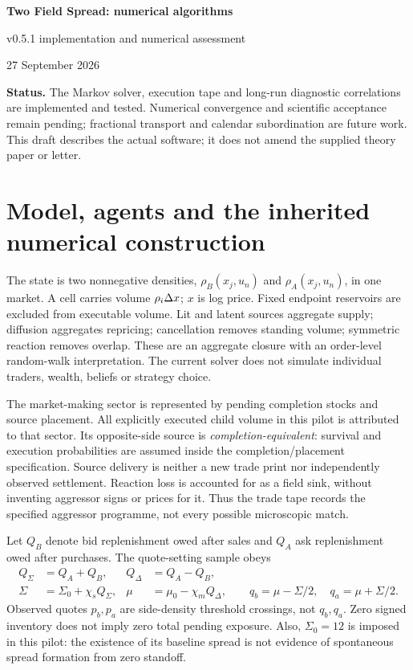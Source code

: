 \documentclass[11pt,a4paper]{article}
\begin{document}
\begin{center}
{\Large\bfseries Two Field Spread: numerical algorithms}\par
{\large v0.5.1 implementation and numerical assessment}\par
27 September 2026
\end{center}
\textbf{Status.} The Markov solver, execution tape and long-run diagnostic correlations are
implemented and tested. Numerical convergence and scientific acceptance
remain pending; fractional transport and calendar subordination are future work. This draft describes the actual
software; it does not amend the supplied theory paper or letter.

\section{Model, agents and the inherited numerical construction}
The state is two nonnegative densities, $\rho_B(x_j,u_n)$ and
$\rho_A(x_j,u_n)$, in one market. A cell carries volume $\rho_i\Delta x$;
$x$ is log price. Fixed endpoint reservoirs are excluded from executable
volume. Lit and latent sources aggregate supply; diffusion aggregates
repricing; cancellation removes standing volume; symmetric reaction removes
overlap. These are an aggregate closure with an order-level random-walk
interpretation. The current solver does not simulate individual traders,
wealth, beliefs or strategy choice.

The market-making sector is represented by pending completion stocks and
source placement. All explicitly executed child volume in this pilot is
attributed to that sector. Its opposite-side source is
\emph{completion-equivalent}: survival and execution probabilities are
assumed inside the completion/placement specification. Source delivery is
neither a new trade print nor independently observed settlement. Reaction
loss is accounted for as a field sink, without inventing aggressor signs or
prices for it. Thus the trade tape records the specified aggressor programme,
not every possible microscopic match.

Let $Q_B$ denote bid replenishment owed after sales and $Q_A$ ask
replenishment owed after purchases. The quote-setting sample obeys
\begin{align}
 Q_\Sigma&=Q_A+Q_B,& Q_\Delta&=Q_A-Q_B,\\
 \Sigma&=\Sigma_0+\chi_s Q_\Sigma,&
 \mu&=\mu_0-\chi_m Q_\Delta,\qquad
 q_b=\mu-\Sigma/2,\quad q_a=\mu+\Sigma/2.
\end{align}
Observed quotes $p_b,p_a$ are side-density threshold crossings, not $q_b,q_a$.
Zero signed inventory does not imply zero total pending exposure. Also,
$\Sigma_0=12$ is imposed in this pilot: the existence of its baseline spread
is not evidence of spontaneous spread formation from zero standoff.
\end{document}
